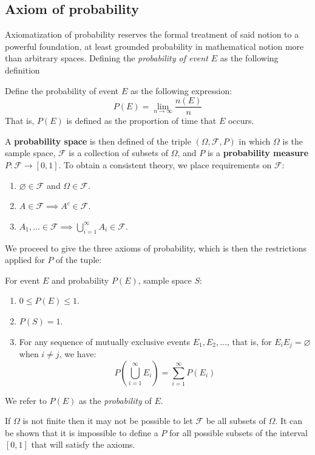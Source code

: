 \subsection{Axiom of probability}
Axiomatization of probability reserves the formal treatment of said notion to a powerful foundation, at least grounded probability in mathematical notion more than arbitrary spaces. Defining the \textit{probability of event $E$} as the following definition
\begin{definition}
    Define the probability of event $E$ as the following expression: $$P(E)= \lim_{ n \to \infty } \frac{n(E)}{n}$$ That is, $P(E)$ is defined as the proportion of time that $E$ occurs.
\end{definition}
A \textbf{probability space} is then defined of the triple $(\Omega, \mathcal{F}, P)$ in which $\Omega$ is the sample space, $\mathcal{F}$ is a collection of subsets of $\Omega$, and $P$ is a \textbf{probability measure} $P:\mathcal{F}\to [0,1]$. To obtain a consistent theory, we place requirements on $\mathcal{F}$: 
\begin{enumerate}
    \item $\varnothing \in \mathcal{F}$ and $\Omega\in \mathcal{F}$. 
    \item $A\in \mathcal{F}\implies A^{c}\in \mathcal{F}$. 
    \item $A_{1},\dots\in \mathcal{F}\implies \bigcup_{i=1}^{\infty}A_{i}\in \mathcal{F}$.  
\end{enumerate}
We proceed to give the three axioms of probability, which is then the restrictions applied for $P$ of the tuple: 
\begin{axiom}
    For event $E$ and probability $P(E)$, sample space $S$: 
    \begin{enumerate}[label=\Roman*.]
        \item $0\leq P(E)\leq 1$. 
        \item $P(S)=1$. 
        \item For any sequence of mutually exclusive events $E_{1},E_{2},\dots$, that is, for $E_{i}E_{j}=\varnothing$ when $i\neq j$, we have: $$P\left( \bigcup^{\infty}_{i=1}E_{i} \right)=\sum^{\infty}_{i=1}P(E_{i})$$
    \end{enumerate}
    We refer to $P(E)$ as the \textit{probability} of $E$. 
\end{axiom}
If $\Omega$ is not finite then it may not be possible to let $\mathcal{F}$ be all subsets of $\Omega$. It can be shown that it is impossible to define a $P$ for all possible subsets of the interval $[0,1]$ that will satisfy the axioms.
